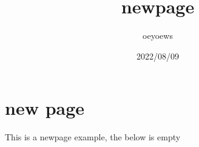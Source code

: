 \documentclass{article}
\title{newpage}
\author{oeyoews}
\date{2022/08/09}
\begin{document}
\maketitle


\section{new page}%

This is a newpage example, the below is empty

\newpage
\end{document}
